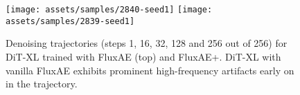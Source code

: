 \begin{figure}[t]
\centering
\texttt{[image: assets/samples/2840-seed1]}
\texttt{[image: assets/samples/2839-seed1]}
\vspace{-0.5cm}
\caption{Denoising trajectories (steps 1, 16, 32, 128 and 256 out of 256) for DiT-XL trained with FluxAE (top) and FluxAE+\regshortname. DiT-XL with vanilla FluxAE exhibits prominent high-frequency artifacts early on in the trajectory.}
\label{fig:traj-comparison}
\end{figure}
